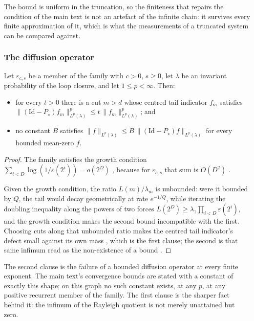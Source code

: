 \noindent The bound is uniform in the truncation, so the finiteness that repairs the condition of the
main text is not an artefact of the infinite chain: it survives every finite approximation of
it, which is what the measurements of a truncated system can be compared against.


\subsubsection{The diffusion operator}


\begin{theorem}
  \label{thm:main_unbounded}
  \leanok
Let $\varepsilon_{c,s}$ be a member of the family with $c>0$, $s\geq0$, let $\lambda$ be an
invariant probability of the loop closure, and let $1\leq p<\infty$. Then:
\begin{itemize}
  \item for every $t>0$ there is a cut $m>d$ whose centred tail indicator $f_m$ satisfies
        $\|(\mathrm{Id}-P_\star)f_m\|^p_{L^p(\lambda)}\leq t\,\|f_m\|^p_{L^p(\lambda)}$; and
  \item no constant $B$ satisfies $\|f\|_{L^p(\lambda)}\leq B\,\|(\mathrm{Id}-P_\star)f\|_{L^p(\lambda)}$
        for every bounded mean-zero $f$.
\end{itemize}
\end{theorem}

\begin{proof}
  \leanok
The family satisfies the growth condition $\sum_{i<D}\log(1/\varepsilon(2^i))=o(2^{D})$
, because for $\varepsilon_{c,s}$ that sum is $O(D^2)$
.

Given the growth condition, the ratio $L(m)/\lambda_m$ is unbounded: were it bounded by $Q$,
the tail would decay geometrically at rate $e^{-1/Q}$, while iterating the doubling inequality
along the powers of two forces $L(2^{D})\geq\lambda_1\prod_{i<D}\varepsilon(2^{i})$, and the
growth condition makes the second bound incompatible with the first. Choosing cuts along that
unbounded ratio makes the centred tail indicator's defect small against its own mass
, which is the first clause; the second is
that same infimum read as the non-existence of a bound
.
\end{proof}

\noindent The second clause is the failure of a bounded diffusion operator at every finite exponent. The
main text's convergence bounds are stated with a constant of exactly this shape; on this graph
no such constant exists, at any $p$, at any positive recurrent member of the family. The first
clause is the sharper fact behind it: the infimum of the Rayleigh quotient is not merely
unattained but zero.


